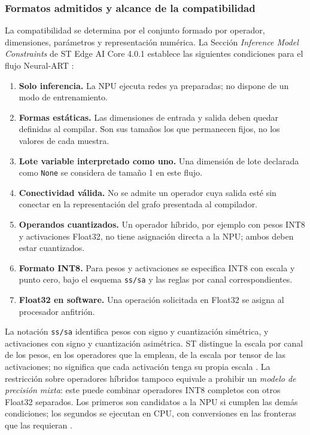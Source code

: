 \subsubsection{Formatos admitidos y alcance de la compatibilidad}
La compatibilidad se determina por el conjunto formado por operador, dimensiones, parámetros y representación numérica. La Sección \emph{Inference Model Constraints} de ST Edge AI Core 4.0.1 establece las siguientes condiciones para el flujo Neural-ART \cite{cap4_stoperators}:
\begin{enumerate}
\item \textbf{Solo inferencia.} La NPU ejecuta redes ya preparadas; no dispone de un modo de entrenamiento.
\item \textbf{Formas estáticas.} Las dimensiones de entrada y salida deben quedar definidas al compilar. Son sus tamaños los que permanecen fijos, no los valores de cada muestra.
\item \textbf{Lote variable interpretado como uno.} Una dimensión de lote declarada como \texttt{None} se considera de tamaño 1 en este flujo.
\item \textbf{Conectividad válida.} No se admite un operador cuya salida esté sin conectar en la representación del grafo presentada al compilador.
\item \textbf{Operandos cuantizados.} Un operador híbrido, por ejemplo con pesos INT8 y activaciones Float32, no tiene asignación directa a la NPU; ambos deben estar cuantizados.
\item \textbf{Formato INT8.} Para pesos y activaciones se especifica INT8 con escala y punto cero, bajo el esquema \texttt{ss/sa} y las reglas por canal correspondientes.
\item \textbf{Float32 en software.} Una operación solicitada en Float32 se asigna al procesador anfitrión.
\end{enumerate}

La notación \texttt{ss/sa} identifica pesos con signo y cuantización simétrica, y activaciones con signo y cuantización asimétrica. ST distingue la escala por canal de los pesos, en los operadores que la emplean, de la escala por tensor de las activaciones; no significa que cada activación tenga su propia escala \cite{cap4_stquant}. La restricción sobre operadores híbridos tampoco equivale a prohibir un \emph{modelo de precisión mixta}: este puede combinar operadores INT8 completos con otros Float32 separados. Los primeros son candidatos a la NPU si cumplen las demás condiciones; los segundos se ejecutan en CPU, con conversiones en las fronteras que las requieran \cite{cap4_stoperators,cap4_stquant}.


